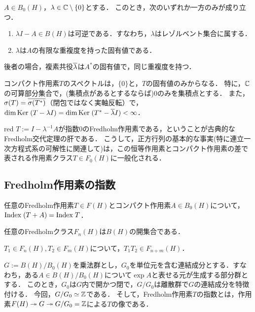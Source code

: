 \documentclass[uplatex,dvipdfmx]{jsreport}
\begin{document}
\begin{corollary}
    $A\in B_0(H)$，$\lambda\in\mathbb{C}\setminus\{0\}$とする．
    このとき，次のいずれか一方のみが成り立つ．
    \begin{enumerate}
        \item $\lambda I-A\in B(H)$は可逆である．すなわち，$\lambda$はレゾルベント集合に属する．
        \item $\lambda$は$A$の有限な重複度を持った固有値である．
    \end{enumerate}
    後者の場合，複素共役$\overline{\lambda}$は$A^*$の固有値で，同じ重複度を持つ．
\end{corollary}
\begin{remarks}
    コンパクト作用素$T$のスペクトルは，$\{0\}$と，$T$の固有値のみからなる．
    特に，$\mathbb{C}$の可算部分集合で，(集積点があるとするならば)$0$のみを集積点とする．
    また，$\sigma(T)=\overline{\sigma(T^*)}$（閉包ではなく実軸反転）で，
    $\dim\mathrm{Ker}\;(T-\lambda I)=\dim\mathrm{Ker}\;(T^*-\overline{\lambda}I)<\infty$．
\end{remarks}

\begin{tbox}{red}{}
    $T:=I-\lambda^{-1} A$が指数$0$のFredholm作用素である，ということが古典的なFredholm交代定理の肝である．
    こうして，正方行列の基本的な事実(特に連立一次方程式系の可解性に関連して)は，この恒等作用素とコンパクト作用素の差で表される作用素クラス$T\in F_0(H)$に一般化される．
\end{tbox}

\subsection{Fredholm作用素の指数}

\begin{theorem}
    任意のFredholm作用素$T\in F(H)$とコンパクト作用素$A\in B_0(H)$について，$\mathrm{Index}\;(T+A)=\mathrm{Index}\; T$．
\end{theorem}

\begin{proposition}
    任意のFredholmクラス$F_n(H)$は$B(H)$の開集合である．
\end{proposition}

\begin{proposition}
    $T_1\in F_n(H),T_2\in F_m(H)$について，$T_1T_2\in F_{n+m}(H)$．
\end{proposition}

\begin{remarks}
    $G:=B(H)/B_0(H)$を乗法群とし，$G_0$を単位元を含む連結成分とする．すなわち，ある$A\in B(H)/B_0(H)$について$\exp A$と表せる元が生成する部分群とする．
    このとき，$G_0$は$G$内で開かつ閉で，$G/G_0$は離散群で$G$の連結成分を特徴付ける．
    今回，$G/G_0\simeq\mathbb{Z}$である．
    そして，Fredholm作用素$T$の指数とは，作用素$F(H)\twoheadrightarrow G\twoheadrightarrow G/G_0=\mathbb{Z}$による$T$の像である．
\end{remarks}
\end{document}
